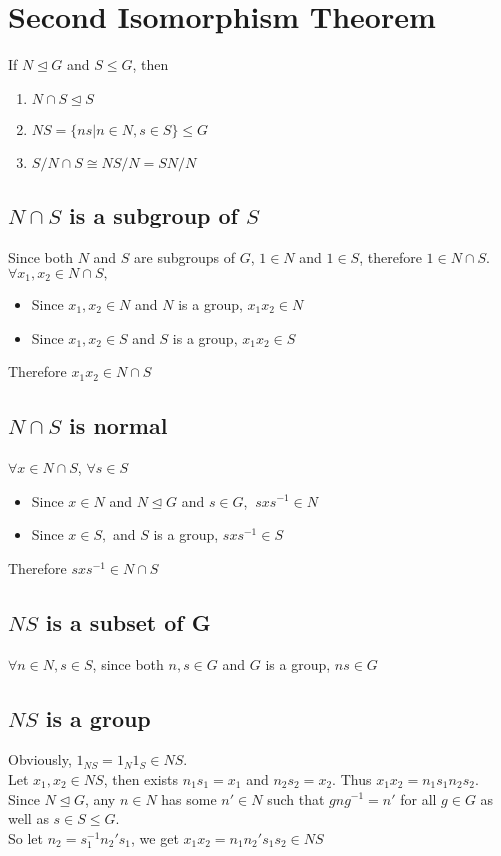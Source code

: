 \documentclass{article}
\begin{document}
	\section*{Second Isomorphism Theorem}
	If $N\trianglelefteq G$ and $S\leq G$, then\begin{enumerate}
		\item $N\cap S\trianglelefteq S$
		\item $NS=\{ns|n\in N,s\in S\}\leq G$
		\item $S/N\cap S\cong NS/N=SN/N$
	\end{enumerate}
	\subsection*{$N\cap S$ is a subgroup of $S$}
	Since both $N$ and $S$ are subgroups of $G$, $1\in N$ and $1\in S$, therefore $1\in N\cap S$.\medskip\\
	$\forall x_1,x_2\in N\cap S,$\begin{itemize}
		\item Since $x_1,x_2\in N$ and $N$ is a group, $x_1x_2\in N$ 
		\item Since $x_1,x_2\in S$ and $S$ is a group, $x_1x_2\in S$ 
	\end{itemize}
	Therefore $x_1x_2\in N\cap S$
	\subsection*{$N\cap S$ is normal}
	$\forall x\in N\cap S$, $\forall s\in S$\begin{itemize}
		\item Since $x\in N$ and $N\trianglelefteq G$ and $s\in G$, $\ sxs^{-1}\in N$
		\item Since $x\in S,$ and $S$ is a group, $sxs^{-1}\in S$
	\end{itemize}
	Therefore $sxs^{-1}\in N\cap S$
	\subsection*{$NS$ is a subset of G}
	$\forall n\in N,s\in S$, since both $n,s\in G$ and $G$ is a group, $ns\in G$
	\subsection*{$NS$ is a group}
	Obviously, $1_{NS}=1_N1_S\in NS$.\\
	Let $x_1,x_2\in NS$, then exists $n_1s_1=x_1$ and $n_2s_2=x_2$. Thus $x_1x_2=n_1s_1n_2s_2$.\\
	Since $N\trianglelefteq G$, any $n\in N$ has some $n'\in N$ such that $gng^{-1}=n'$ for all $g\in G$ as well as $s\in S\leq G$.\\
	So let $n_2=s_1^{-1}n_2's_1$, we get $x_1x_2=n_1n_2's_1s_2\in NS$
\end{document}
